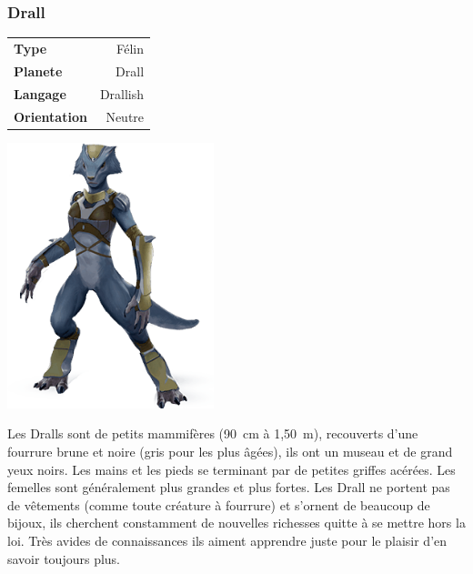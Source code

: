 \subsubsection{Drall} 
	\vspace{-1\baselineskip}
	\begin{flushright}	
		\begin{tabular}{|l|r|}
		\textbf{Type} 		 & Félin \\
		\textbf{Planete} 	 & Drall \\
		\textbf{Langage} 	 & Drallish \\
		\textbf{Orientation} & Neutre\\
		\end{tabular}
	\end{flushright}
	\vspace{-6\baselineskip}
	\includegraphics[width=6cm]{img/personnages/races/drall.png}

Les Dralls sont de petits mammifères (90~cm à 1,50~m), recouverts d’une fourrure brune et noire (gris pour les plus âgées), ils ont un museau et de grand yeux noirs. Les mains et les pieds se terminant par de petites griffes acérées. Les femelles sont généralement plus grandes et plus fortes. Les Drall ne portent pas de vêtements (comme toute créature à fourrure) et s’ornent de beaucoup de bijoux, ils cherchent constamment de nouvelles richesses quitte à se mettre hors la loi. Très avides de connaissances ils aiment apprendre juste pour le plaisir d’en savoir toujours plus.\\

